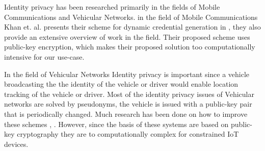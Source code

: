 {Identity privacy has been researched primarily in the fields of Mobile Communications and Vehicular Networks. in the field of Mobile Communications Khan et. al. presents their scheme for dynamic credential generation in \cite{khan2013enhanced}, they also provide an extensive overview of work in the field. Their proposed scheme uses public-key encryption, which makes their proposed solution too computationally intensive for our use-case.

In the field of Vehicular Networks Identity privacy is important\cite{whyte2013security} since a vehicle broadcasting the the identity of the vehicle or driver would enable location tracking of the vehicle or driver. Most of the identity privacy issues of Vehicular networks are solved by pseudonyms, the vehicle is issued with a public-key pair that is periodically changed. Much research has been done on how to improve these schemes \cite{lin2013}, \cite{lin2008tsvc}. However, since the basis of these systems are based on public-key cryptography they are to computationally complex for constrained IoT devices. 

}
